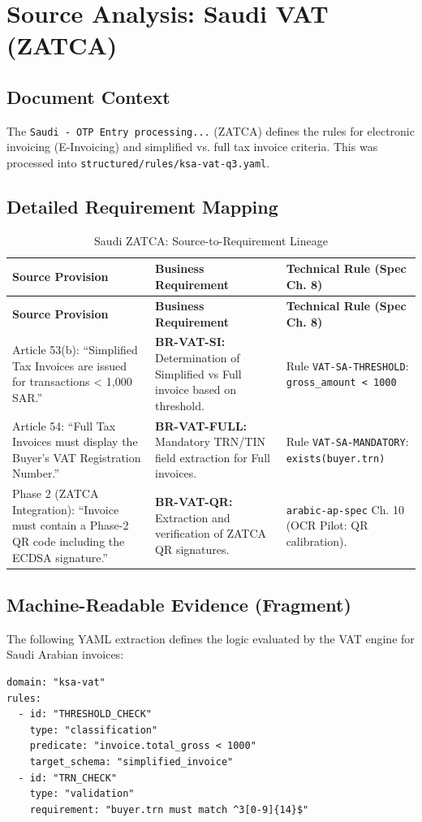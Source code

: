 \chapter{Source Analysis: Saudi VAT (ZATCA)}
\label{ch:analysis-sa-vat}

\section{Document Context}
The \texttt{Saudi - OTP Entry processing...} (ZATCA) defines the rules for electronic invoicing (E-Invoicing) and simplified vs. full tax invoice criteria. This was processed into \texttt{structured/rules/ksa-vat-q3.yaml}.

\section{Detailed Requirement Mapping}

\begin{longtable}{p{5cm} p{5cm} p{5cm}}
\caption{Saudi ZATCA: Source-to-Requirement Lineage} \\
\toprule
\textbf{Source Provision} & \textbf{Business Requirement} & \textbf{Technical Rule (Spec Ch. 8)} \\
\midrule
\endfirsthead
\toprule
\textbf{Source Provision} & \textbf{Business Requirement} & \textbf{Technical Rule (Spec Ch. 8)} \\
\midrule
\endhead
Article 53(b): ``Simplified Tax Invoices are issued for transactions < 1,000 SAR.'' & \textbf{BR-VAT-SI:} Determination of Simplified vs Full invoice based on threshold. & Rule \texttt{VAT-SA-THRESHOLD}: \texttt{gross\_amount < 1000} \\
\midrule
Article 54: ``Full Tax Invoices must display the Buyer's VAT Registration Number.'' & \textbf{BR-VAT-FULL:} Mandatory TRN/TIN field extraction for Full invoices. & Rule \texttt{VAT-SA-MANDATORY}: \texttt{exists(buyer.trn)} \\
\midrule
Phase 2 (ZATCA Integration): ``Invoice must contain a Phase-2 QR code including the ECDSA signature.'' & \textbf{BR-VAT-QR:} Extraction and verification of ZATCA QR signatures. & \texttt{arabic-ap-spec} Ch. 10 (OCR Pilot: QR calibration). \\
\bottomrule
\end{longtable}

\section{Machine-Readable Evidence (Fragment)}
The following YAML extraction defines the logic evaluated by the VAT engine for Saudi Arabian invoices:

\begin{lstlisting}[language=yamlx]
domain: "ksa-vat"
rules:
  - id: "THRESHOLD_CHECK"
    type: "classification"
    predicate: "invoice.total_gross < 1000"
    target_schema: "simplified_invoice"
  - id: "TRN_CHECK"
    type: "validation"
    requirement: "buyer.trn must match ^3[0-9]{14}$"
\end{lstlisting}
